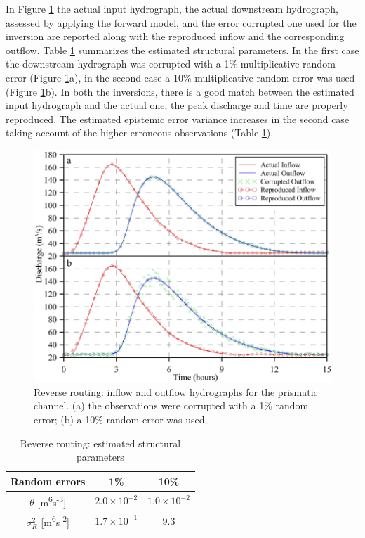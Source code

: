 \documentclass[11pt,oneside,onecolumn]{usgsreport}
\begin{document}
\begin{appendix}
In Figure \ref{fig:Reverse-routing} the actual input hydrograph,
the actual downstream hydrograph, assessed by applying the forward
model, and the error corrupted one used for the inversion are reported
along with the reproduced inflow and the corresponding outflow. Table
\ref{tab:Reverse-routing} summarizes the estimated structural parameters.
In the first case the downstream hydrograph was corrupted with a 1\%
multiplicative random error (Figure \ref{fig:Reverse-routing}a),
in the second case a 10\% multiplicative random error was used (Figure
\ref{fig:Reverse-routing}b). In both the inversions, there is a good
match between the estimated input hydrograph and the actual one; the
peak discharge and time are properly reproduced. The estimated epistemic
error variance increases in the second case taking account of the
higher erroneous observations (Table \ref{tab:Reverse-routing}).

\begin{figure}[H]
\noindent \begin{centering}
\includegraphics[scale=0.9]{figures/Reverse_Routing}
\par\end{centering}

\caption{\label{fig:Reverse-routing}Reverse routing: inflow and outflow hydrographs
for the prismatic channel. (a) the observations were corrupted with
a 1\% random error; (b) a 10\% random error was used.  }
\end{figure}


\begin{table}[H]
\noindent \begin{centering}
\begin{tabular}{ccc}
\hline 
Random errors & 1\% & 10\%\tabularnewline
\hline 
$\theta$ {[}m\textsuperscript{6}s\textsuperscript{-3}{]} & $2.0\times10^{-2}$ & $1.0\times10^{-2}$\tabularnewline
\hline 
$\sigma_{R}^{2}$ {[}m\textsuperscript{6}s\textsuperscript{-2}{]} & $1.7\times10^{-1}$ & $9.3$\tabularnewline
\hline 
\end{tabular}
\par\end{centering}

\caption{\label{tab:Reverse-routing}Reverse routing: estimated structural
parameters  }
\end{table}
\end{appendix}
\end{document}
